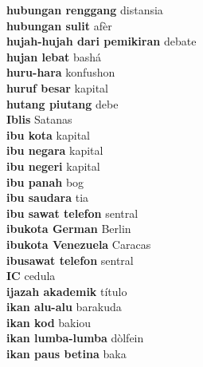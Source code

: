\textbf{ hubungan renggang  } distansia \\
\textbf{ hubungan sulit  } afèr \\
\textbf{ hujah-hujah dari pemikiran  } debate \\
\textbf{ hujan lebat  } bashá \\
\textbf{ huru-hara  } konfushon \\
\textbf{ huruf besar  } kapital \\
\textbf{ hutang piutang  } debe \\
\textbf{ Iblis  } Satanas \\
\textbf{ ibu kota  } kapital \\
\textbf{ ibu negara  } kapital \\
\textbf{ ibu negeri  } kapital \\
\textbf{ ibu panah  } bog \\
\textbf{ ibu saudara  } tia \\
\textbf{ ibu sawat telefon  } sentral \\
\textbf{ ibukota German  } Berlin \\
\textbf{ ibukota Venezuela  } Caracas \\
\textbf{ ibusawat telefon  } sentral \\
\textbf{ IC  } cedula \\
\textbf{ ijazah akademik  } título \\
\textbf{ ikan alu-alu  } barakuda \\
\textbf{ ikan kod  } bakiou \\
\textbf{ ikan lumba-lumba  } dòlfein \\
\textbf{ ikan paus betina  } baka \\
